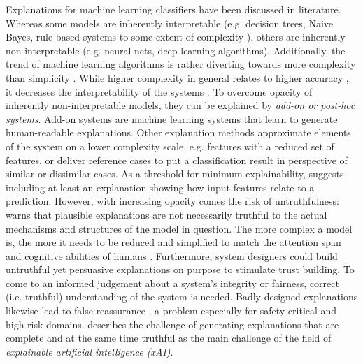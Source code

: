 Explanations for machine learning classifiers have been discussed in literature. 
Whereas some models are inherently interpretable (e.g. decision trees, Naive Bayes, rule-based systems to some extent of complexity \cite{kotsiantis2007supervised}), others are inherently non-interpretable (e.g. neural nets, deep learning algorithms). Additionally, the trend of machine learning algorithms is rather diverting towards more complexity than simplicity \cite{arras2017relevant}. While higher complexity in general relates to higher accuracy \cite{richardson2018survey}, it decreases the interpretability of the systems \cite{chen2018learning}. To overcome opacity of inherently non-interpretable models, they can be explained by \textit{add-on or post-hoc systems}. Add-on systems are machine learning systems that learn to generate human-readable explanations. Other explanation methods approximate elements of the system on a lower complexity scale, e.g. features with a reduced set of features, or deliver reference cases to put a classification result in perspective of similar or dissimilar cases. As a threshold for minimum explainability, \cite{goodman16eu} suggests including at least an explanation showing how input features relate to a prediction.\medskip \newline
However, with increasing opacity comes the risk of untruthfulness: \cite{lipton2016mythos} warns that plausible explanations are not necessarily truthful to the actual mechanisms and structures of the model in question. The more complex a model is, the more it needs to be reduced and simplified to match the attention span and cognitive abilities of humans \cite{kulesza2013too}. Furthermore, system designers could build untruthful yet persuasive explanations on purpose to stimulate trust building. To come to an informed judgement about a system's integrity or fairness, correct (i.e. truthful) understanding of the system is needed. Badly designed explanations likewise lead to false reassurance \cite{burrell2016machine}, a problem especially for safety-critical and high-risk domains. \cite{gilpin2018explaining} describes the challenge of generating explanations that are complete and at the same time truthful as the main challenge of the field of \textit{explainable artificial intelligence (xAI)}.\newline
